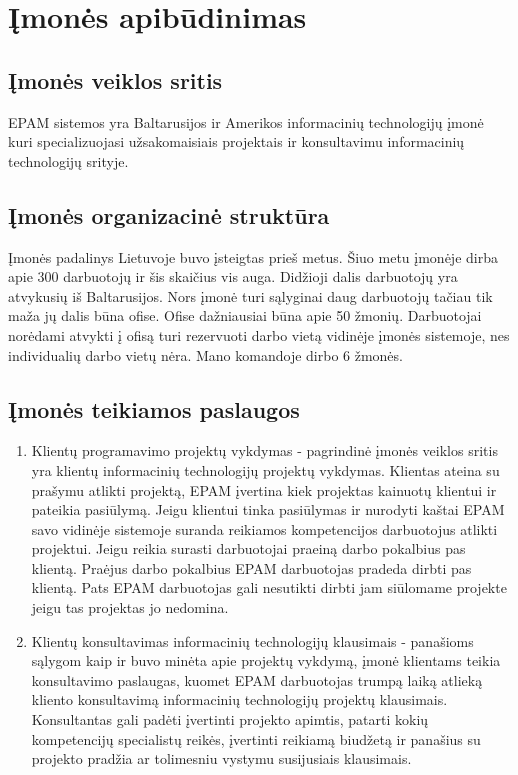 \documentclass{VUMIFPSkursinis}
\begin{document}
\section{Įmonės apibūdinimas}
	\subsection{Įmonės veiklos sritis}
		EPAM sistemos yra Baltarusijos ir Amerikos informacinių technologijų įmonė kuri specializuojasi užsakomaisiais
		projektais ir konsultavimu informacinių technologijų srityje. 		
		
	\subsection{Įmonės organizacinė struktūra}
		Įmonės padalinys Lietuvoje buvo įsteigtas prieš metus. 
		Šiuo metu įmonėje dirba apie 300 darbuotojų ir šis skaičius vis auga. 
		Didžioji dalis darbuotojų yra atvykusių iš Baltarusijos.
		Nors įmonė turi sąlyginai daug darbuotojų tačiau tik maža jų dalis būna ofise.
		Ofise dažniausiai būna apie 50 žmonių.
		Darbuotojai norėdami atvykti į ofisą turi rezervuoti darbo vietą vidinėje įmonės sistemoje, nes individualių
		darbo vietų nėra.
		Mano komandoje dirbo 6 žmonės.
		
	\subsection{Įmonės teikiamos paslaugos}
		\begin{enumerate}
			\item{
			Klientų programavimo projektų vykdymas - pagrindinė įmonės veiklos sritis yra klientų informacinių technologijų
		projektų vykdymas. Klientas ateina su prašymu atlikti projektą, EPAM įvertina kiek projektas kainuotų klientui
			ir pateikia pasiūlymą. Jeigu klientui tinka pasiūlymas ir nurodyti kaštai EPAM savo vidinėje sistemoje 
			suranda reikiamos kompetencijos darbuotojus atlikti projektui. Jeigu reikia surasti darbuotojai praeiną
			darbo pokalbius pas klientą.
			Praėjus darbo pokalbius EPAM darbuotojas pradeda dirbti pas klientą.
			Pats EPAM darbuotojas gali nesutikti dirbti jam siūlomame projekte jeigu tas projektas jo nedomina.
			}
			
			\item{
			Klientų konsultavimas informacinių technologijų klausimais - panašioms sąlygom kaip ir buvo minėta apie
			projektų vykdymą, įmonė klientams teikia konsultavimo paslaugas, kuomet EPAM darbuotojas trumpą laiką
			atlieką kliento konsultavimą informacinių technologijų projektų klausimais.
			Konsultantas gali padėti įvertinti projekto apimtis, patarti kokių kompetencijų specialistų reikės,
			įvertinti reikiamą biudžetą ir panašius su projekto pradžia ar tolimesniu vystymu susijusiais klausimais.		
			}
		\end{enumerate}
\end{document}
